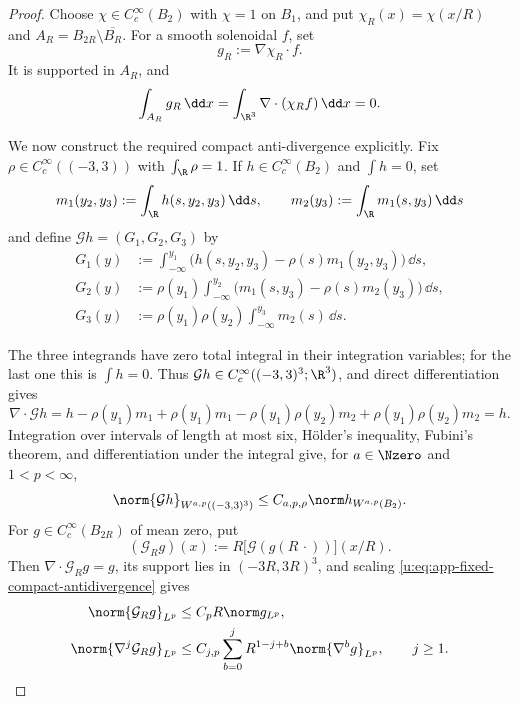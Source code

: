 \begin{proof}
Choose \(\chi\in C_c^\infty(B_2)\) with
\(\chi=1\) on \(B_1\), and put
\(\chi_R(x)=\chi(x/R)\) and
\(A_R=B_{2R}\setminus\overline{B_R}\).  For a smooth solenoidal \(f\), set
\[
 g_R:=\nabla\chi_R\cdot f.
\]
It is supported in \(A_R\), and
\[
 \int_{A_R}g_R\,\dd x
 =\int_{\R^3}\nabla\cdot(\chi_Rf)\,\dd x=0.
\]
\begin{samepage}
We now construct the required compact anti-divergence explicitly.  Fix
\(\rho\in C_c^\infty((-3,3))\) with \(\int_{\R}\rho=1\).  If
\(h\in C_c^\infty(B_2)\) and \(\int h=0\), set
\[
 m_1(y_2,y_3):=\int_{\R} h(s,y_2,y_3)\,\dd s,
 \qquad
 m_2(y_3):=\int_{\R} m_1(s,y_3)\,\dd s
\]
and define \(\mathcal Gh=(G_1,G_2,G_3)\) by
\begin{align*}
 G_1(y)
 &:=\int_{-\infty}^{y_1}
 \bigl(h(s,y_2,y_3)-\rho(s)m_1(y_2,y_3)\bigr)\,\dd s,\\
 G_2(y)
 &:=\rho(y_1)\int_{-\infty}^{y_2}
 \bigl(m_1(s,y_3)-\rho(s)m_2(y_3)\bigr)\,\dd s,\\
 G_3(y)
 &:=\rho(y_1)\rho(y_2)
 \int_{-\infty}^{y_3}m_2(s)\,\dd s.
\end{align*}
\par
\end{samepage}
The three integrands have zero total integral in their integration
variables; for the last one this is \(\int h=0\).  Thus
\(\mathcal Gh\in C_c^\infty((-3,3)^3;\R^3)\), and direct differentiation
gives
\[
 \nabla\cdot\mathcal Gh
 =h-\rho(y_1)m_1
  +\rho(y_1)m_1-\rho(y_1)\rho(y_2)m_2
  +\rho(y_1)\rho(y_2)m_2
 =h.
\]
Integration over intervals of length at most six, H\"older's inequality,
Fubini's theorem, and differentiation under the integral give, for
\(a\in\Nzero\) and \(1<p<\infty\),
\begin{equation}
 \norm{\mathcal Gh}_{W^{a,p}((-3,3)^3)}
 \le C_{a,p,\rho}\norm h_{W^{a,p}(B_2)}.
 \label{u:eq:app-fixed-compact-antidivergence}
\end{equation}
For \(g\in C_c^\infty(B_{2R})\) of mean zero, put
\[
 (\mathcal G_Rg)(x)
 :=R\bigl[\mathcal G(g(R\,\cdot))\bigr](x/R).
\]
Then \(\nabla\cdot\mathcal G_Rg=g\), its support lies in
\((-3R,3R)^3\), and scaling \eqref{u:eq:app-fixed-compact-antidivergence}
gives
\begin{align}
 \norm{\mathcal G_Rg}_{L^p}
 &\le C_pR\norm g_{L^p},\notag\\
 \norm{\nabla^j\mathcal G_Rg}_{L^p}
 &\le C_{j,p}\sum_{b=0}^{j}
 R^{1-j+b}\norm{\nabla^bg}_{L^p},
 \qquad j\ge1.
 \label{u:eq:app-scaled-compact-antidivergence}
\end{align}

\end{proof}
